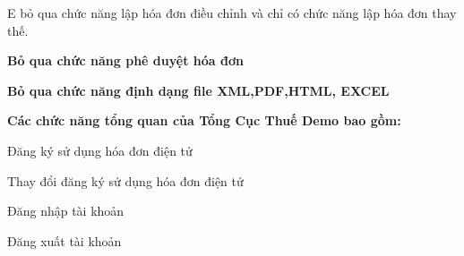 E bỏ qua chức năng   lập hóa đơn điều chỉnh  và chỉ có chức năng   lập hóa đơn thay thế.






\textbf{Bỏ qua chức năng  phê duyệt hóa đơn  }






\textbf{Bỏ qua chức năng  định dạng file XML,PDF,HTML, EXCEL   }













\textbf{Các chức năng tổng quan của Tổng Cục Thuế Demo bao gồm:}


























Đăng ký sử dụng hóa đơn điện tử













Thay đổi đăng ký sử dụng hóa đơn điện tử













Đăng nhập tài khoản













Đăng xuất tài khoản













